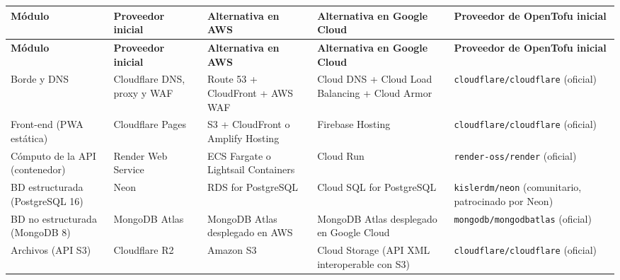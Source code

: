\documentclass[11pt,a4paper]{article}
\begin{document}
\begingroup\small
\begin{longtable}{@{}>{\raggedright\arraybackslash\hspace{0pt}}p{}>{\raggedright\arraybackslash\hspace{0pt}}p{}>{\raggedright\arraybackslash\hspace{0pt}}p{}>{\raggedright\arraybackslash\hspace{0pt}}p{}>{\raggedright\arraybackslash\hspace{0pt}}p{}@{}}
\toprule
\textbf{Módulo} & \textbf{Proveedor inicial} & \textbf{Alternativa en AWS} & \textbf{Alternativa en Google Cloud} & \textbf{Proveedor de OpenTofu inicial} \\ \midrule
\endfirsthead
\toprule
\textbf{Módulo} & \textbf{Proveedor inicial} & \textbf{Alternativa en AWS} & \textbf{Alternativa en Google Cloud} & \textbf{Proveedor de OpenTofu inicial} \\ \midrule
\endhead
\bottomrule
\endlastfoot
Borde y DNS & Cloudflare DNS, proxy y WAF & Route 53 + CloudFront + AWS WAF & Cloud DNS + Cloud Load Balancing + Cloud Armor & \texttt{cloudflare/\allowbreak{}cloudflare} (oficial) \\ \addlinespace[0.25em]
Front-end (PWA estática) & Cloudflare Pages & S3 + CloudFront o Amplify Hosting & Firebase Hosting & \texttt{cloudflare/\allowbreak{}cloudflare} (oficial) \\ \addlinespace[0.25em]
Cómputo de la API (contenedor) & Render Web Service & ECS Fargate o Lightsail Containers & Cloud Run & \texttt{render-{}\allowbreak{}oss/\allowbreak{}render} (oficial) \\ \addlinespace[0.25em]
BD estructurada (PostgreSQL 16) & \mbox{Neon} & RDS for PostgreSQL & Cloud SQL for PostgreSQL & \texttt{kislerdm/\allowbreak{}neon} (comunitario, patrocinado por Neon) \\ \addlinespace[0.25em]
BD no estructurada (MongoDB 8) & MongoDB Atlas & MongoDB Atlas desplegado en AWS & MongoDB Atlas desplegado en Google Cloud & \texttt{mongodb/\allowbreak{}mongodbatlas} (oficial) \\ \addlinespace[0.25em]
Archivos (API S3) & Cloudflare R2 & Amazon S3 & Cloud Storage (API XML interoperable con S3) & \texttt{cloudflare/\allowbreak{}cloudflare} (oficial) \\
\end{longtable}
\endgroup
\end{document}
